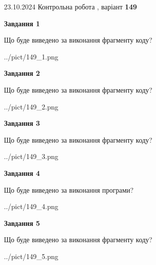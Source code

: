 \documentclass[12pt, ukrainian]{article}
\begin{document}
{\Large{23.10.2024 Контрольна робота , варіант  \No \textbf { 149 }\par}}
{
\begin {large}
{\begin {center}\textbf{Завдання 1}\end {center}}

Що буде виведено за виконання фрагменту коду?\par
\begin{center}
	{../pict/149_1.png}
\end{center}
\newpage

{\begin {center}\textbf{Завдання 2}\end {center}}

Що буде виведено за виконання фрагменту коду?\par
\begin{center}
	{../pict/149_2.png}
\end{center}
\newpage

{\begin {center}\textbf{Завдання 3}\end {center}}

Що буде виведено за виконання фрагменту коду?\par
\begin{center}
	{../pict/149_3.png}
\end{center}
\newpage

{\begin {center}\textbf{Завдання 4}\end {center}}

Що буде виведено за виконання програми?\par
\begin{center}
	{../pict/149_4.png}
\end{center}
\newpage

{\begin {center}\textbf{Завдання 5}\end {center}}

Що буде виведено за виконання фрагменту коду?\par
\begin{center}
	{../pict/149_5.png}
\end{center}
\newpage


\end{large}}
\end{document}
